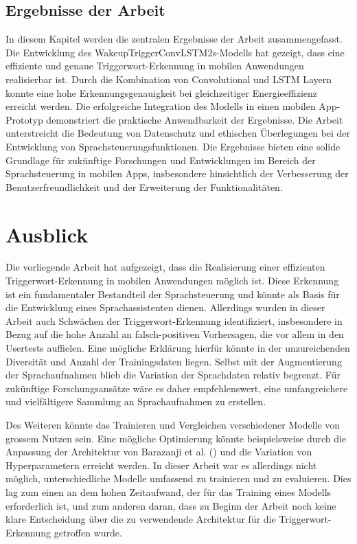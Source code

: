 \documentclass[11pt,a4paper]{article}
\begin{document}
\subsection{Ergebnisse der Arbeit}
In diesem Kapitel werden die zentralen Ergebnisse der Arbeit zusammengefasst. Die Entwicklung des 
WakeupTriggerConvLSTM2s-Modells hat gezeigt, dass eine effiziente und genaue Triggerwort-Erkennung 
in mobilen Anwendungen realisierbar ist. Durch die Kombination von Convolutional und LSTM Layern 
konnte eine hohe Erkennungsgenauigkeit bei gleichzeitiger Energieeffizienz erreicht werden. Die 
erfolgreiche Integration des Modells in einen mobilen App-Prototyp demonstriert die praktische 
Anwendbarkeit der Ergebnisse. Die Arbeit unterstreicht die Bedeutung von Datenschutz und 
ethischen Überlegungen bei der Entwicklung von Sprachsteuerungsfunktionen. Die Ergebnisse bieten 
eine solide Grundlage für zukünftige Forschungen und Entwicklungen im Bereich der Sprachsteuerung 
in mobilen Apps, insbesondere hinsichtlich der Verbesserung der Benutzerfreundlichkeit und der 
Erweiterung der Funktionalitäten.





\section{Ausblick}
Die vorliegende Arbeit hat aufgezeigt, dass die Realisierung einer effizienten Triggerwort-Erkennung 
in mobilen Anwendungen möglich ist. Diese Erkennung ist ein fundamentaler Bestandteil der 
Sprachsteuerung und könnte als Basis für die Entwicklung eines Sprachassistenten dienen. Allerdings 
wurden in dieser Arbeit auch Schwächen der Triggerwort-Erkennung identifiziert, insbesondere in 
Bezug auf die hohe Anzahl an falsch-positiven Vorhersagen, die vor allem in den Usertests auffielen. 
Eine mögliche Erklärung hierfür könnte in der unzureichenden Diversität und Anzahl der Trainingsdaten 
liegen. Selbst mit der Augmentierung der Sprachaufnahmen blieb die Variation der Sprachdaten relativ 
begrenzt. Für zukünftige Forschungsansätze wäre es daher empfehlenswert, eine umfangreichere und 
vielfältigere Sammlung an Sprachaufnahmen zu erstellen.

\noindent \newline
Des Weiteren könnte das Trainieren und Vergleichen verschiedener Modelle von grossem Nutzen sein. 
Eine mögliche Optimierung könnte beispielsweise durch die Anpassung der Architektur von Barazanji 
et al. (\cite{barazanji2023heyditto}) und die Variation von Hyperparametern erreicht werden. In 
dieser Arbeit war es allerdings nicht möglich, unterschiedliche Modelle umfassend zu trainieren und 
zu evaluieren. Dies lag zum einen an dem hohen Zeitaufwand, der für das Training eines Modells 
erforderlich ist, und zum anderen daran, dass zu Beginn der Arbeit noch keine klare Entscheidung 
über die zu verwendende Architektur für die Triggerwort-Erkennung getroffen wurde.
\end{document}
